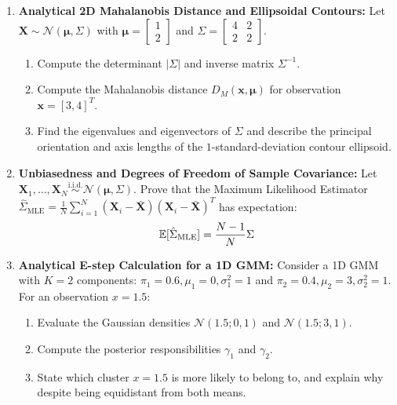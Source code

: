 \begin{enumerate}[label=\textbf{P\arabic*.}]
    \item \textbf{Analytical 2D Mahalanobis Distance and Ellipsoidal Contours:}
    Let $\mathbf{X} \sim \mathcal{N}(\boldsymbol{\mu}, \Sigma)$ with $\boldsymbol{\mu} = \begin{bmatrix} 1 \\ 2 \end{bmatrix}$ and $\Sigma = \begin{bmatrix} 4 & 2 \\ 2 & 2 \end{bmatrix}$.
    \begin{enumerate}[label=(\alph*)]
        \item Compute the determinant $|\Sigma|$ and inverse matrix $\Sigma^{-1}$.
        \item Compute the Mahalanobis distance $D_M(\mathbf{x}, \boldsymbol{\mu})$ for observation $\mathbf{x} = [3, 4]^T$.
        \item Find the eigenvalues and eigenvectors of $\Sigma$ and describe the principal orientation and axis lengths of the $1$-standard-deviation contour ellipsoid.
    \end{enumerate}

    \item \textbf{Unbiasedness and Degrees of Freedom of Sample Covariance:}
    Let $\mathbf{X}_1, \dots, \mathbf{X}_N \stackrel{\text{i.i.d.}}{\sim} \mathcal{N}(\boldsymbol{\mu}, \Sigma)$.
    Prove that the Maximum Likelihood Estimator $\hat{\Sigma}_{\text{MLE}} = \frac{1}{N}\sum_{i=1}^N (\mathbf{X}_i - \bar{\mathbf{X}})(\mathbf{X}_i - \bar{\mathbf{X}})^T$ has expectation:
    \begin{equation}
    \operatorname{\mathbb{E}}[\hat{\Sigma}_{\text{MLE}}] = \frac{N - 1}{N} \Sigma
    \end{equation}

    \item \textbf{Analytical E-step Calculation for a 1D GMM:}
    Consider a 1D GMM with $K = 2$ components: $\pi_1 = 0.6, \mu_1 = 0, \sigma_1^2 = 1$ and $\pi_2 = 0.4, \mu_2 = 3, \sigma_2^2 = 1$.
    For an observation $x = 1.5$:
    \begin{enumerate}[label=(\alph*)]
        \item Evaluate the Gaussian densities $\mathcal{N}(1.5; 0, 1)$ and $\mathcal{N}(1.5; 3, 1)$.
        \item Compute the posterior responsibilities $\gamma_1$ and $\gamma_2$.
        \item State which cluster $x = 1.5$ is more likely to belong to, and explain why despite being equidistant from both means.
    \end{enumerate}


\end{enumerate}
